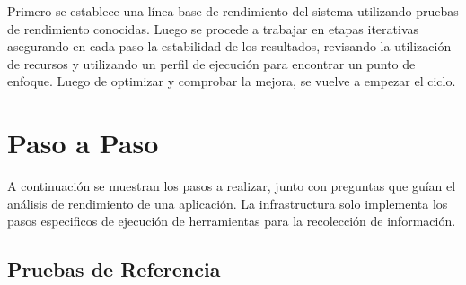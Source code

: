 \documentclass[a4paper]{report}
\begin{document}
Primero se establece una línea base de rendimiento del sistema utilizando pruebas de rendimiento conocidas.
Luego se procede a trabajar en etapas iterativas asegurando en cada paso la estabilidad de los resultados, revisando la utilización de recursos y utilizando un perfil de ejecución para encontrar un punto de enfoque. Luego de optimizar y comprobar la mejora, se vuelve a empezar el ciclo.

\section{Paso a Paso}

A continuación se muestran los pasos a realizar, junto con preguntas que guían el análisis de rendimiento de una aplicación.
La infrastructura solo implementa los pasos especificos de ejecución de herramientas para la recolección de información.

\subsection{Pruebas de Referencia}
\end{document}
